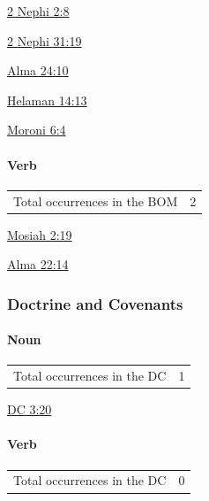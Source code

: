 			\begin{compactdesc}
				\item[{\hyperref[2NEPHI-2-8]{2 Nephi 2:8}}]
				\item[{\hyperref[2NEPHI-31-19]{2 Nephi 31:19}}]
				\item[{\hyperref[ALMA-24-10]{Alma 24:10}}]
				\item[{\hyperref[HELAMAN-14-13]{Helaman 14:13}}]
				\item[{\hyperref[MORONI-6-4]{Moroni 6:4}}]
			\end{compactdesc}
			
		\paragraph{Verb}
	
			\begin{tabular}{ll}
				Total occurrences in the BOM & 2
			\end{tabular}
			
			\begin{compactdesc}
				\item[{\hyperref[MOsIAH-2-19]{Mosiah 2:19}}]
				\item[{\hyperref[ALMA-22-14]{Alma 22:14}}]
			\end{compactdesc}
		
	\subsubsection{Doctrine and Covenants} %
		\label{MERIT-DC}
		
		\paragraph{Noun}
	
			\begin{tabular}{ll}
				Total occurrences in the DC & 1
			\end{tabular}
			
			\begin{compactdesc}
				\item[{\hyperref[DC3-20]{DC 3:20}}]
			\end{compactdesc}
			
		\paragraph{Verb}
		
			\begin{tabular}{ll}
				Total occurrences in the DC & 0
			\end{tabular}
		
